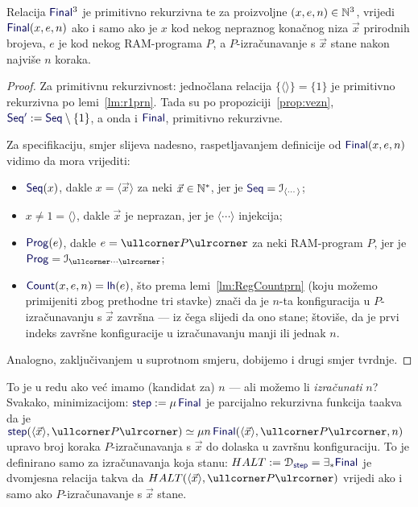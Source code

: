 \begin{lema}[{name=[primitivna rekurzivnost završnosti konfiguracije]}]\label{lm:Finalspec}
Relacija $\f{Final}^3$ je primitivno rekurzivna te
za proizvoljne $(x,e,n)\in{\mathbb N}^3$, vrijedi $\f{Final}(x,e,n)$ ako i samo ako je $x$ kod nekog nepraznog konačnog niza $\vec x$ prirodnih brojeva, $e$ je kod nekog RAM-programa $P$, a $P$-izračunavanje s $\vec x$ stane nakon najviše $n$ koraka.
\end{lema}
\begin{proof}
Za primitivnu rekurzivnost: jednočlana relacija $\{\langle\rangle\}=\{1\}$ je primitivno rekurzivna po lemi~\ref{lm:r1prn}. Tada su po propoziciji~\ref{prop:vezn}, $\f{Seq'}:=\f{Seq}\setminus\{1\}$, a onda i $\f{Final}$, primitivno rekurzivne.

Za specifikaciju, smjer slijeva nadesno, raspetljavanjem definicije od $\f{Final}(x,e,n)$ vidimo da mora vrijediti:
\begin{itemize}
    \item $\f{Seq}(x)$, dakle $x=\langle\vec x\rangle$ za neki $\vec x\in{\mathbb N}^*$, jer je $\f{Seq}=\im{\langle\cdots\rangle}$;
    \item $x\ne1=\langle\rangle$, dakle $\vec x$ je neprazan, jer je $\langle\cdots\rangle$ injekcija;
    \item $\f{Prog}(e)$, dakle $e=\kprog{P}$ za neki RAM-program $P$, jer je $\f{Prog}=\im{\kprog{\cdots}}$;
    \item $\f{Count}(x,e,n)\eq\f{lh}(e)$, što prema lemi~\ref{lm:RegCountprn} (koju možemo primijeniti zbog prethodne tri stavke) znači da je $n$-ta konfiguracija u $P$-izračunavanju s $\vec x$ završna --- iz čega slijedi da ono stane; štoviše, da je prvi indeks završne konfiguracije u izračunavanju manji ili jednak $n$.
\end{itemize}
Analogno, zaključivanjem u suprotnom smjeru, dobijemo i drugi smjer tvrdnje.
\end{proof}

To je u redu ako već imamo (kandidat za) $n$ --- ali možemo li \emph{izračunati} $n$? Svakako, minimizacijom: $\f{step}:=\mu\,\f{Final}$ je parcijalno rekurzivna funkcija taakva da je $\f{step}(\langle\vec x\rangle,\kprog P)\simeq\mu n\,\f{Final}(\langle\vec x\rangle,\kprog{P},n)$ upravo broj koraka $P$-izračunavanja s $\vec x$ do dolaska u završnu konfiguraciju. To je definirano samo za izračunavanja koja stanu: $HALT:=\dom{\f{step}}=\exists_*\f{Final}$ je dvomjesna relacija takva da $HALT(\langle \vec x\rangle,\kprog P)$ vrijedi ako i samo ako $P$-izračunavanje s $\vec x$ stane.

